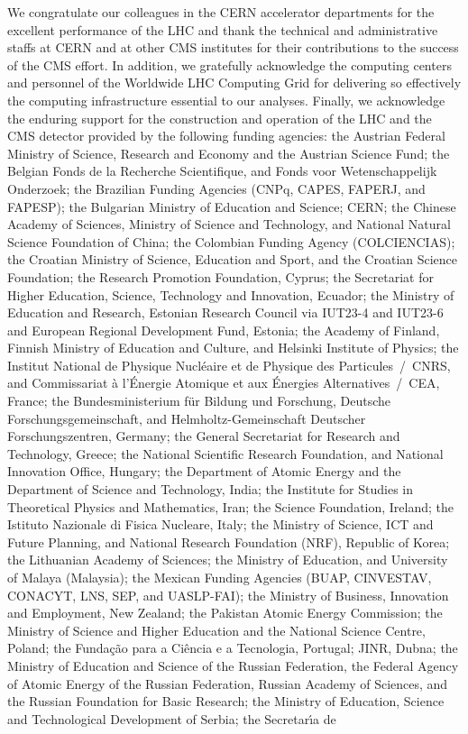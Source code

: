 \documentclass[11pt,twoside,a4paper,cmspaper,final,collab]{cms-tdr}
\begin{document}
\begin{acknowledgments}

 We congratulate our colleagues in the CERN accelerator departments for the excellent performance of the LHC and thank the technical and administrative staffs at CERN and at other CMS institutes for their contributions to the success of the CMS effort. In addition, we gratefully acknowledge the computing centers and personnel of the Worldwide LHC Computing Grid for delivering so effectively the computing infrastructure essential to our analyses. Finally, we acknowledge the enduring support for the construction and operation of the LHC and the CMS detector provided by the following funding agencies: the Austrian Federal Ministry of Science, Research and Economy and the Austrian Science Fund; the Belgian Fonds de la Recherche Scientifique, and Fonds voor Wetenschappelijk Onderzoek; the Brazilian Funding Agencies (CNPq, CAPES, FAPERJ, and FAPESP); the Bulgarian Ministry of Education and Science; CERN; the Chinese Academy of Sciences, Ministry of Science and Technology, and National Natural Science Foundation of China; the Colombian Funding Agency (COLCIENCIAS); the Croatian Ministry of Science, Education and Sport, and the Croatian Science Foundation; the Research Promotion Foundation, Cyprus; the Secretariat for Higher Education, Science, Technology and Innovation, Ecuador; the Ministry of Education and Research, Estonian Research Council via IUT23-4 and IUT23-6 and European Regional Development Fund, Estonia; the Academy of Finland, Finnish Ministry of Education and Culture, and Helsinki Institute of Physics; the Institut National de Physique Nucl\'eaire et de Physique des Particules~/~CNRS, and Commissariat \`a l'\'Energie Atomique et aux \'Energies Alternatives~/~CEA, France; the Bundesministerium f\"ur Bildung und Forschung, Deutsche Forschungsgemeinschaft, and Helmholtz-Gemeinschaft Deutscher Forschungszentren, Germany; the General Secretariat for Research and Technology, Greece; the National Scientific Research Foundation, and National Innovation Office, Hungary; the Department of Atomic Energy and the Department of Science and Technology, India; the Institute for Studies in Theoretical Physics and Mathematics, Iran; the Science Foundation, Ireland; the Istituto Nazionale di Fisica Nucleare, Italy; the Ministry of Science, ICT and Future Planning, and National Research Foundation (NRF), Republic of Korea; the Lithuanian Academy of Sciences; the Ministry of Education, and University of Malaya (Malaysia); the Mexican Funding Agencies (BUAP, CINVESTAV, CONACYT, LNS, SEP, and UASLP-FAI); the Ministry of Business, Innovation and Employment, New Zealand; the Pakistan Atomic Energy Commission; the Ministry of Science and Higher Education and the National Science Centre, Poland; the Funda\c{c}\~ao para a Ci\^encia e a Tecnologia, Portugal; JINR, Dubna; the Ministry of Education and Science of the Russian Federation, the Federal Agency of Atomic Energy of the Russian Federation, Russian Academy of Sciences, and the Russian Foundation for Basic Research; the Ministry of Education, Science and Technological Development of Serbia; the Secretar\'{\i}a de 
\end{acknowledgments}
\end{document}
